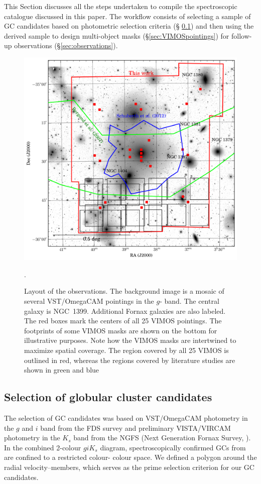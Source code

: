 \documentclass[useAMS,usenatbib]{mn2e}
\begin{document}
This Section discusses all the steps undertaken to compile the spectroscopic 
catalogue discussed in this paper. The 
workflow consists of selecting a sample of GC candidates based on photometric 
selection criteria (\S 
\ref{sec:selectionGC}) and then using the derived sample to design multi-object 
masks (\S \ref{sec:VIMOSpointings}) for follow-up 
observations (\S \ref{sec:observations}).

\begin{figure}
\centering
\includegraphics[scale=0.7]{figures/fov.png} 
\caption{Layout of the observations. The background image is a mosaic of 
several VST/OmegaCAM pointings in the $g$-
band. The central galaxy is NGC~1399. Additional Fornax galaxies are also 
labeled. The red boxes mark the centers of all 
25 VIMOS pointings. The footprints of some VIMOS masks are shown on the bottom 
for illustrative purposes. Note how 
the VIMOS masks are intertwined to maximize spatial coverage. The region 
covered by all 25 VIMOS is outlined in red, 
whereas the regions covered by literature studies are shown in green 
\citep{Bergond07} and blue \citep{Schuberth}}.
\label{fig:fov}
\end{figure}

\subsection{Selection of globular cluster candidates}
\label{sec:selectionGC}
The selection of GC candidates was based on VST/OmegaCAM photometry in the $g$ 
and $i$ band from the FDS survey 
\citep{DAbrusco16,Iodice16} and preliminary VISTA/VIRCAM photometry in the 
$K_s$ band from the NGFS (Next 
Generation Fornax Survey, \citealt{Munoz14}). 
In the combined 2-colour $giK_s$ diagram, spectroscopically confirmed GCs from 
\citet{Schuberth} are confined to a restricted colour-
colour space. 
We defined a polygon around the radial velocity--members, which serves as the 
prime selection criterion for our GC candidates. 
\end{document}
